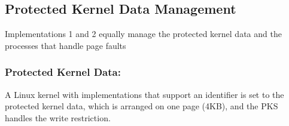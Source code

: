 
\subsection{Protected Kernel Data Management}

Implementations 1 and 2 equally manage the protected kernel data and the processes
that handle page faults

\subsubsection{Protected Kernel Data:}

A Linux kernel with implementations that support an identifier is set to the
protected kernel data, which is arranged on one page (4KB), and the PKS handles
the write restriction.

